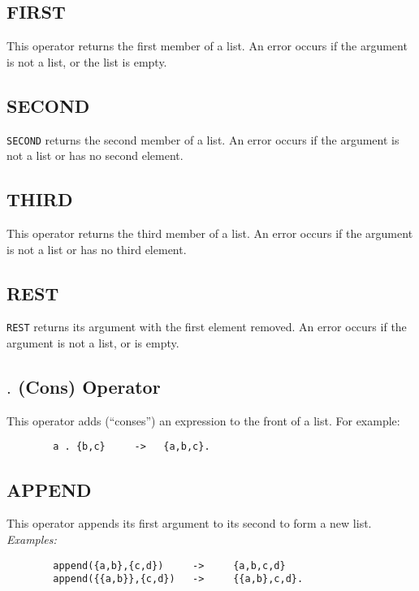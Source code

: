 \subsection{FIRST}

This operator returns the first member of a list.  An error
occurs if the argument is not a list, or the list is empty.

\subsection{SECOND}

{\tt SECOND} returns the second member of a list.  An error
occurs if the argument is not a list or has no second element.

\subsection{THIRD}

This operator returns the third member of a list.  An error
occurs if the argument is not a list or has no third element.

\subsection{REST}

{\tt REST} returns its argument with the first element
removed.  An error occurs if the argument is not a list, or is empty.

\subsection{$.$ (Cons) Operator}

This operator adds (``conses'') an expression to the
front of a list.  For example:
\begin{verbatim}
        a . {b,c}     ->   {a,b,c}.
\end{verbatim}

\subsection{APPEND}

This operator appends its first argument to its second to
form a new list.
{\it Examples:}
\begin{verbatim}
        append({a,b},{c,d})     ->     {a,b,c,d}
        append({{a,b}},{c,d})   ->     {{a,b},c,d}.
\end{verbatim}

